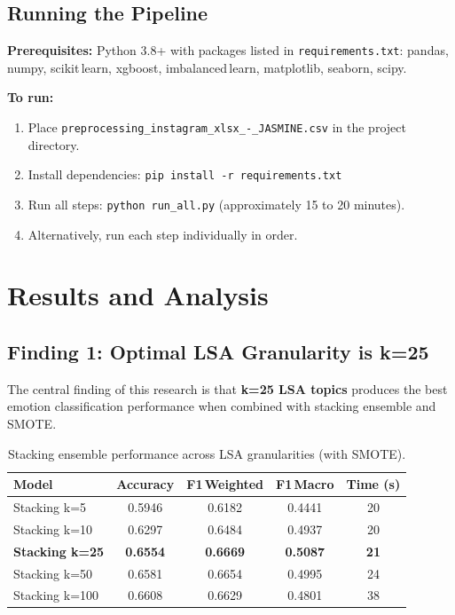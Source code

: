 \documentclass[12pt,a4paper,twoside]{article}
\theoremstyle{definition}
\begin{document}
\subsection{Running the Pipeline}

\begin{filebox}
\textbf{Prerequisites:} Python 3.8+ with packages listed in \texttt{requirements.txt}: pandas, numpy, scikit\,learn, xgboost, imbalanced\,learn, matplotlib, seaborn, scipy.

\textbf{To run:}
\begin{enumerate}[leftmargin=2em]
    \item Place \texttt{preprocessing\_instagram\_xlsx\_-\_JASMINE.csv} in the project directory.
    \item Install dependencies: \texttt{pip install -r requirements.txt}
    \item Run all steps: \texttt{python run\_all.py} (approximately 15 to 20 minutes).
    \item Alternatively, run each step individually in order.
\end{enumerate}
\end{filebox}

\section{Results and Analysis}
\label{sec:results}

\subsection{Finding 1: Optimal LSA Granularity is k=25}

The central finding of this research is that \textbf{k=25 LSA topics} produces the best emotion classification performance when combined with stacking ensemble and SMOTE.

\begin{table}[h]
\centering
\caption{Stacking ensemble performance across LSA granularities (with SMOTE).}
\label{tab:granularity}
\begin{tabular}{lcccc}
\toprule
\textbf{Model} & \textbf{Accuracy} & \textbf{F1\,Weighted} & \textbf{F1\,Macro} & \textbf{Time (s)} \\
\midrule
Stacking k=5 & 0.5946 & 0.6182 & 0.4441 & 20 \\
Stacking k=10 & 0.6297 & 0.6484 & 0.4937 & 20 \\
\textbf{Stacking k=25} & \textbf{0.6554} & \textbf{0.6669} & \textbf{0.5087} & \textbf{21} \\
Stacking k=50 & 0.6581 & 0.6654 & 0.4995 & 24 \\
Stacking k=100 & 0.6608 & 0.6629 & 0.4801 & 38 \\
\bottomrule
\end{tabular}
\end{table}
\end{document}

